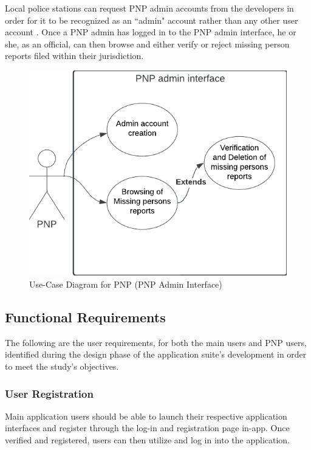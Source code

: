 Local police stations can request PNP admin accounts from the developers in order for it to be recognized as an ``admin" account rather than any other user account . Once a PNP admin has logged in to the PNP admin interface, he or she, as an official, can then browse and either verify or reject missing person reports filed within their jurisdiction.
\begin{figure}[!h]
    \centering
    \includegraphics[scale=0.5]{figures/Chapter3/Chapt3_UseCase_PNP.png}
    \caption{Use-Case Diagram for PNP (PNP Admin Interface)}
    \label{fig:UseCasePNP}
\end{figure}


\subsection{Functional Requirements}

The following are the user requirements, for both the main users and PNP users, identified during the design phase of the application suite's development in order to meet the study's objectives. 

\subsubsection{User Registration}
Main application users should be able to launch their respective application interfaces and register through the log-in and registration page in-app. Once verified and registered, users can then utilize and log in into the application. 

